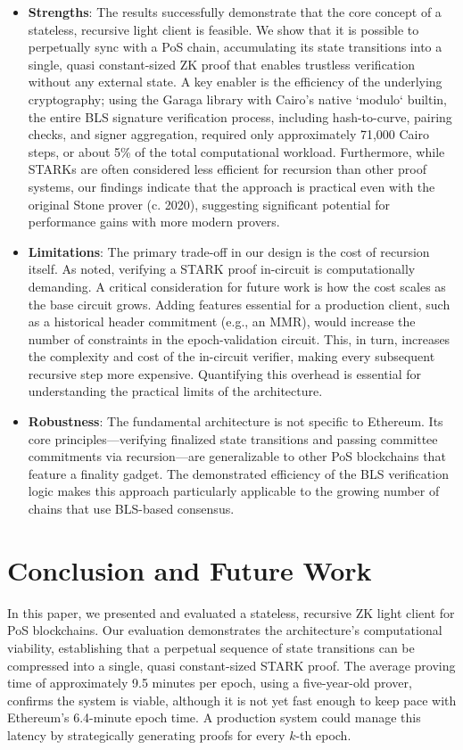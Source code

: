 \documentclass[runningheads]{llncs}
\begin{document}
\begin{itemize}
    \item \textbf{Strengths}: The results successfully demonstrate that the core concept of a stateless, recursive light client is feasible. We show that it is possible to perpetually sync with a PoS chain, accumulating its state transitions into a single, quasi constant-sized ZK proof that enables trustless verification without any external state. A key enabler is the efficiency of the underlying cryptography; using the Garaga library with Cairo's native `modulo` builtin, the entire BLS signature verification process, including hash-to-curve, pairing checks, and signer aggregation, required only approximately 71,000 Cairo steps, or about 5\% of the total computational workload. Furthermore, while STARKs are often considered less efficient for recursion than other proof systems, our findings indicate that the approach is practical even with the original Stone prover (c. 2020), suggesting significant potential for performance gains with more modern provers.

    \item \textbf{Limitations}: The primary trade-off in our design is the cost of recursion itself. As noted, verifying a STARK proof in-circuit is computationally demanding. A critical consideration for future work is how the cost scales as the base circuit grows. Adding features essential for a production client, such as a historical header commitment (e.g., an MMR), would increase the number of constraints in the epoch-validation circuit. This, in turn, increases the complexity and cost of the in-circuit verifier, making every subsequent recursive step more expensive. Quantifying this overhead is essential for understanding the practical limits of the architecture.

    \item \textbf{Robustness}: The fundamental architecture is not specific to Ethereum. Its core principles—verifying finalized state transitions and passing committee commitments via recursion—are generalizable to other PoS blockchains that feature a finality gadget. The demonstrated efficiency of the BLS verification logic makes this approach particularly applicable to the growing number of chains that use BLS-based consensus.
\end{itemize}

\section{Conclusion and Future Work}
\label{section:conclusion}
In this paper, we presented and evaluated a stateless, recursive ZK light client for PoS blockchains. Our evaluation demonstrates the architecture's computational viability, establishing that a perpetual sequence of state transitions can be compressed into a single, quasi constant-sized STARK proof. The average proving time of approximately 9.5 minutes per epoch, using a five-year-old prover, confirms the system is viable, although it is not yet fast enough to keep pace with Ethereum's 6.4-minute epoch time. A production system could manage this latency by strategically generating proofs for every \(k\)-th epoch.
\end{document}
